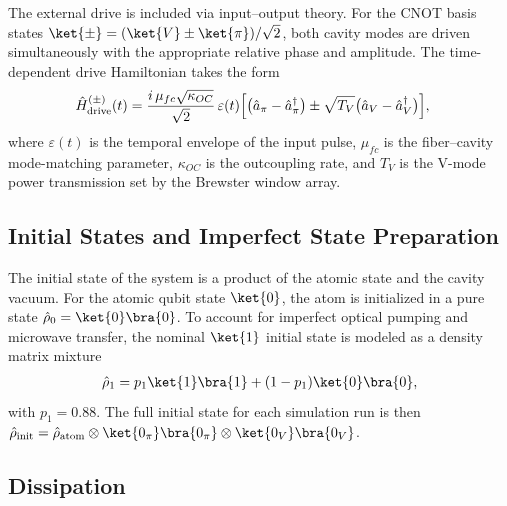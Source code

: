 The external drive is included via input--output theory. For the CNOT basis states $\ket{\pm} = (\ket{V} \pm \ket{\pi})/\sqrt{2}$, both cavity modes are driven simultaneously with the appropriate relative phase and amplitude. The time-dependent drive Hamiltonian takes the form
\begin{align}
	\hat{H}_{\text{drive}}^{(\pm)}(t) & = \frac{i\, \mu_{fc} \sqrt{\kappa_{OC}}}{\sqrt{2}}\, \varepsilon(t) \Bigl[\bigl(\hat{a}_\pi - \hat{a}_\pi^\dagger\bigr) \pm \sqrt{T_V}\bigl(\hat{a}_V - \hat{a}_V^\dagger\bigr)\Bigr],
\end{align}
where $\varepsilon(t)$ is the temporal envelope of the input pulse, $\mu_{fc}$ is the fiber--cavity mode-matching parameter, $\kappa_{OC}$ is the outcoupling rate, and $T_V$ is the V-mode power transmission set by the Brewster window array.

\subsection{Initial States and Imperfect State Preparation}

The initial state of the system is a product of the atomic state and the cavity vacuum. For the atomic qubit state $\ket{0}$, the atom is initialized in a pure state $\hat{\rho}_0 = \ket{0}\bra{0}$. To account for imperfect optical pumping and microwave transfer, the nominal $\ket{1}$ initial state is modeled as a density matrix mixture
\begin{align}
	\hat{\rho}_1 = p_1 \ket{1}\bra{1} + (1 - p_1)\ket{0}\bra{0}, \label{eq:imperfect_prep}
\end{align}
with $p_1 = 0.88$. The full initial state for each simulation run is then $\hat{\rho}_{\text{init}} = \hat{\rho}_{\text{atom}} \otimes \ket{0_\pi}\bra{0_\pi} \otimes \ket{0_V}\bra{0_V}$.

\subsection{Dissipation}

